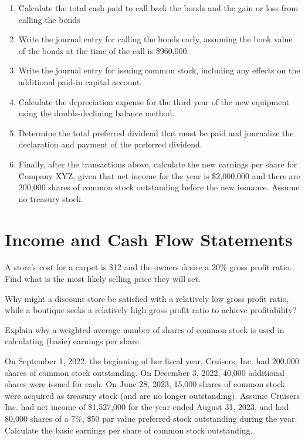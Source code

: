 \documentclass{scrartcl}
\begin{document}
\bigskip

\begin{enumerate}
    \item Calculate the total cash paid to call back the bonds and the
        gain or loss from calling the bonds
    \item Write the journal entry for calling the bonds early,
        assuming the book value of the bonds at the time of the call is
        \$960,000.
    \item Write the journal entry for issuing common stock, including
        any effects on the additional paid-in capital account.
    \item Calculate the depreciation expense for the third year of the
        new equipment using the double-declining balance method.
    \item Determine the total preferred dividend that must be paid and 
        journalize the declaration and payment of the preferred
        dividend.
    \item Finally, after the transactions above, calculate the new 
        earnings per share for Company XYZ, given that net income
        for the year is \$2,000,000 and there are 200,000 shares of
        common stock outstanding before the new issuance. 
        Assume no treasury stock. 
\end{enumerate}

\newpage

\section{Income and Cash Flow Statements}

A store's cost for a carpet is \$12 and the owners desire a 20\% gross
profit ratio. Find what is the most likely selling price they will set.

\vspace{10em}

Why might a discount store be satisfied with a relatively low gross profit
ratio, while a boutique seeks a relatively high gross profit ratio to 
achieve profitability?

\vspace{10em}

Explain why a weighted-average number of shares of common stock is used
in calculating (basic) earnings per share.

\vspace{10em}

On September 1, 2022, the beginning of her fiscal year, Cruisers, Inc.
had 200,000 shares of common stock outstanding. On December 3, 2022,
40,000 additional shares were issued for cash. On June 28, 2023,
15,000 shares of common stock were acquired as treasury stock (and are no
longer outstanding). Assume Cruisers Inc. had net income of 
\$1,527,000 for the year ended August 31, 2023, and had 80,000 shares of 
a 7\%, \$50 par value preferred stock outstanding during the year.
Calculate the basic earnings per share of common stock outstanding. 
\end{document}
